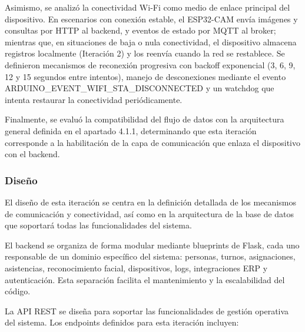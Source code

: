 Asimismo, se analizó la conectividad Wi-Fi como medio de enlace principal del dispositivo. En escenarios con conexión estable, el ESP32-CAM envía imágenes y consultas por HTTP al backend, y eventos de estado por MQTT al broker; mientras que, en situaciones de baja o nula conectividad, el dispositivo almacena registros localmente (Iteración 2) y los reenvía cuando la red se restablece. Se definieron mecanismos de reconexión progresiva con backoff exponencial (3, 6, 9, 12 y 15 segundos entre intentos), manejo de desconexiones mediante el evento ARDUINO\_EVENT\_WIFI\_STA\_DISCONNECTED y un watchdog que intenta restaurar la conectividad periódicamente.

Finalmente, se evaluó la compatibilidad del flujo de datos con la arquitectura general definida en el apartado 4.1.1, determinando que esta iteración corresponde a la habilitación de la capa de comunicación que enlaza el dispositivo con el backend.

\subsubsection{Diseño}

El diseño de esta iteración se centra en la definición detallada de los mecanismos de comunicación y conectividad, así como en la arquitectura de la base de datos que soportará todas las funcionalidades del sistema.

El backend se organiza de forma modular mediante blueprints de Flask, cada uno responsable de un dominio específico del sistema: personas, turnos, asignaciones, asistencias, reconocimiento facial, dispositivos, logs, integraciones ERP y autenticación. Esta separación facilita el mantenimiento y la escalabilidad del código.

La API REST se diseña para soportar las funcionalidades de gestión operativa del sistema. Los endpoints definidos para esta iteración incluyen:

